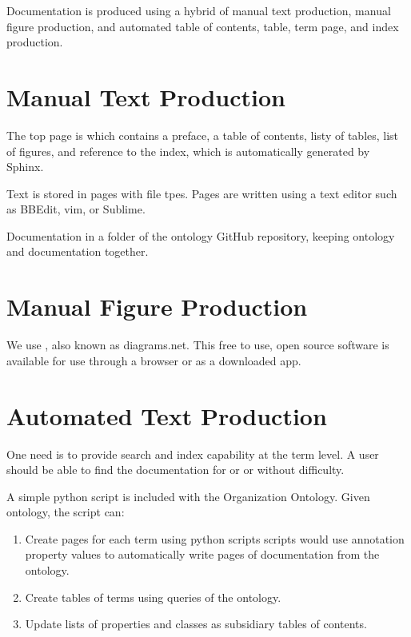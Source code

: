 \documentclass[letterpaper,10pt,english]{sphinxmanual}
\begin{document}
\sphinxAtStartPar
Documentation is produced using a hybrid of manual text production, manual
figure production, and automated table of contents, table, term page, and index
production.


\section{Manual Text Production}
\label{\detokenize{documentation-authors:manual-text-production}}
\sphinxAtStartPar
The top page is  which contains a preface, a table of contents, listy
of tables, list of figures, and reference to the index, which is automatically
generated by Sphinx.

\sphinxAtStartPar
Text is stored in pages with  file tpes.  Pages are written using a text editor
such as BBEdit, vim, or Sublime.

\sphinxAtStartPar
Documentation in a  folder of the ontology GitHub repository, keeping ontology and
documentation together.


\section{Manual Figure Production}
\label{\detokenize{documentation-authors:manual-figure-production}}
\sphinxAtStartPar
We use , also known as diagrams.net.  This free to use,
open source software is available for use through a browser or as a downloaded
app.


\section{Automated Text Production}
\label{\detokenize{documentation-authors:automated-text-production}}
\sphinxAtStartPar
One need is to provide search and index capability at the term level. A
user should be able to find the documentation for  or  or
 without difficulty.

\sphinxAtStartPar
A simple python script  is included with the Organization
Ontology.  Given  ontology, the script can:
\begin{enumerate}
%
\item {} 
\sphinxAtStartPar
Create pages for each term using python scripts \textendash{} scripts would use annotation
property values to automatically write pages of documentation from the ontology.

\item {} 
\sphinxAtStartPar
Create tables of terms using queries of the ontology.

\item {} 
\sphinxAtStartPar
Update lists of properties and classes as subsidiary tables of contents.

\end{enumerate}
\end{document}
